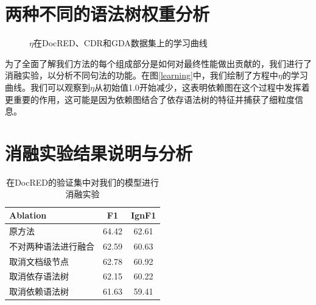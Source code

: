 \documentclass[bachelor]{thesis-uestc}
\begin{document}
\section{两种不同的语法树权重分析}\label{sec:weight}
\begin{figure}[!t]
    \caption{$\eta$在DocRED、CDR和GDA数据集上的学习曲线}
\end{figure}\label{learning}
为了全面了解我们方法的每个组成部分是如何对最终性能做出贡献的，我们进行了消融实验，以分析不同句法的功能。在图\ref{learning}中，我们绘制了方程中$\eta$的学习曲线。我们可以观察到$\eta$从初始值1.0开始减少，这表明依赖图在这个过程中发挥着更重要的作用，这可能是因为依赖图结合了依存语法树的特征并捕获了细粒度信息。 \par

\section{消融实验结果说明与分析}\label{sec:inter}

\begin{table}[]
    \begin{tabular}{llc}
    \hline
    Ablation              & \multicolumn{1}{c}{F1} & \multicolumn{1}{l}{IgnF1} \\ \hline
    原方法             & 64.42                  & 62.61                     \\ 
    不对两种语法进行融合   & 62.59                  & 60.63                     \\
    取消文档级节点 & 62.78                   & 60.92                     \\
    取消依存语法树 & 62.15                  & 60.22                     \\ 
    取消依赖语法树   & 61.63                  & 59.41                     \\
    \hline
    \end{tabular}
    \caption{在DocRED的验证集中对我们的模型进行消融实验}
\end{table}\label{ablation}
\end{document}
